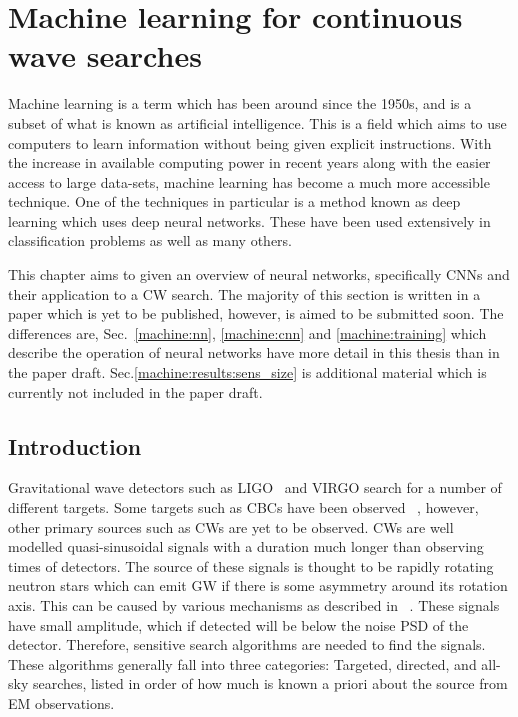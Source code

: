\chapter{\label{machine} Machine learning for continuous wave searches}


Machine learning is a term which has been around since the 1950s, and is a subset of what is known as artificial intelligence.
This is a field which aims to use computers to learn information without being given explicit instructions.
With the increase in available computing power in recent years along with the easier access to large data-sets, machine learning has become a much more accessible technique.
One of the techniques in particular is a method known as deep learning which uses deep neural networks.
These have been used extensively in classification problems as well as many others.

This chapter aims to given an overview of neural networks, specifically \glspl{CNN} and their application to a \gls{CW} search. 
The majority of this section is written in a paper which is yet to be published, however, is aimed to be submitted soon.
The differences are, Sec.~\ref{machine:nn}, \ref{machine:cnn} and \ref{machine:training} which describe the operation of neural networks have more detail in this thesis than in the paper draft. 
Sec.\ref{machine:results:sens_size} is additional material which is currently not included in the paper draft.


\section{\label{machine:intro} Introduction}

%
Gravitational wave detectors such as \gls{LIGO}~\cite{abbott2009LIGOLaser,aasi2015AdvancedLIGO} and VIRGO
\cite{acernese2015AdvancedVirgo,acernese2008StatusVirgo} search for a number of different targets. 
Some targets such as \glspl{CBC} have been observed ~\cite{abbott2017GW170817Observation,abbott2017GW170814ThreeDetector,abbott2016ObservationGravitational},
however, other primary sources such as \glspl{CW} are yet to be observed.
\glspl{CW} are well modelled quasi-sinusoidal signals with a
duration much longer than observing times of detectors.
The source of these signals is thought to be rapidly rotating neutron stars which can emit \gls{GW} if there is some asymmetry around its rotation axis. 
This can be caused by various mechanisms as described in ~\cite{prix2009GravitationalWaves}. 
These signals have small amplitude, which if detected will be below the noise \gls{PSD} of the detector.
Therefore, sensitive search algorithms are needed to find the signals. 
These algorithms generally fall into three categories: Targeted,
directed, and all-sky searches, listed in order of how much is known a priori
about the source from \gls{EM} observations. 

